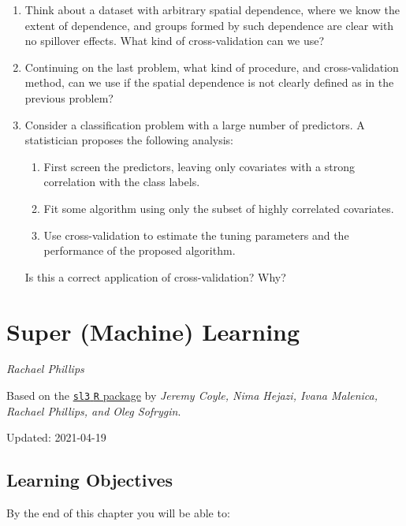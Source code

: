 \documentclass[12pt, krantz2,]{krantz}
\providecommand{\tightlist}{%
  \setlength{\itemsep}{0pt}\setlength{\parskip}{0pt}}
\theoremstyle{definition}
\theoremstyle{definition}
\theoremstyle{definition}
\newcommand{\1}{\mathbbm{1}}
\begin{document}
\begin{enumerate}
\def\labelenumi{\arabic{enumi}.}
\item
  Think about a dataset with arbitrary spatial dependence, where we know
  the extent of dependence, and groups formed by such dependence are clear
  with no spillover effects. What kind of cross-validation can we use?
\item
  Continuing on the last problem, what kind of procedure, and cross-validation
  method, can we use if the spatial dependence is not clearly defined as in the
  previous problem?
\item
  Consider a classification problem with a large number of predictors. A
  statistician proposes the following analysis:

  \begin{enumerate}
  \def\labelenumii{\alph{enumii}.}
  \tightlist
  \item
    First screen the predictors, leaving only covariates with a strong
    correlation with the class labels.
  \item
    Fit some algorithm using only the subset of highly correlated covariates.
  \item
    Use cross-validation to estimate the tuning parameters and the performance
    of the proposed algorithm.
  \end{enumerate}

  Is this a correct application of cross-validation? Why?
\end{enumerate}

\hypertarget{sl3}{%
\section{Super (Machine) Learning}\label{sl3}}

\emph{Rachael Phillips}

Based on the \href{https://github.com/tlverse/sl3}{\texttt{sl3} \texttt{R} package} by \emph{Jeremy
Coyle, Nima Hejazi, Ivana Malenica, Rachael Phillips, and Oleg Sofrygin}.

Updated: 2021-04-19

\hypertarget{learning-objectives-3}{%
\subsection*{Learning Objectives}\label{learning-objectives-3}}


By the end of this chapter you will be able to:
\end{document}
